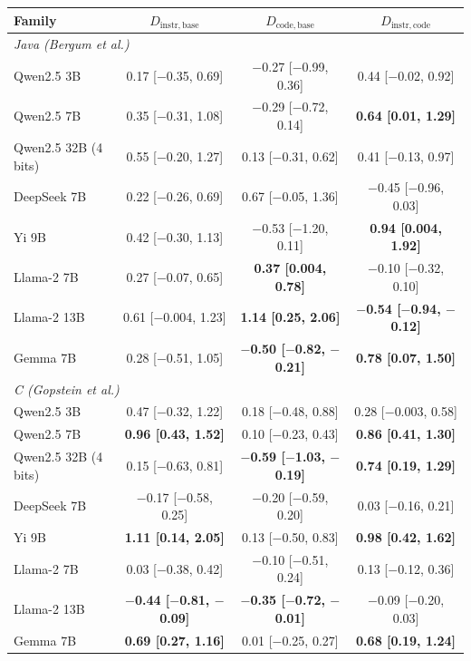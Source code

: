 {\scriptsize\setlength{\tabcolsep}{2.5pt}
\begin{tabular}{lccc}
\toprule
Family & $D_{\mathrm{instr},\mathrm{base}}$ & $D_{\mathrm{code},\mathrm{base}}$ & $D_{\mathrm{instr},\mathrm{code}}$ \\
\midrule
\multicolumn{4}{l}{\textit{Java (Bergum et al.)}} \\
\midrule
Qwen2.5 3B & 0.17 [$-$0.35, 0.69] & $-$0.27 [$-$0.99, 0.36] & 0.44 [$-$0.02, 0.92] \\
Qwen2.5 7B & 0.35 [$-$0.31, 1.08] & $-$0.29 [$-$0.72, 0.14] & \textbf{0.64 [0.01, 1.29]} \\
Qwen2.5 32B (4 bits) & 0.55 [$-$0.20, 1.27] & 0.13 [$-$0.31, 0.62] & 0.41 [$-$0.13, 0.97] \\
DeepSeek 7B & 0.22 [$-$0.26, 0.69] & 0.67 [$-$0.05, 1.36] & $-$0.45 [$-$0.96, 0.03] \\
Yi 9B & 0.42 [$-$0.30, 1.13] & $-$0.53 [$-$1.20, 0.11] & \textbf{0.94 [0.004, 1.92]} \\
Llama-2 7B & 0.27 [$-$0.07, 0.65] & \textbf{0.37 [0.004, 0.78]} & $-$0.10 [$-$0.32, 0.10] \\
Llama-2 13B & 0.61 [$-$0.004, 1.23] & \textbf{1.14 [0.25, 2.06]} & \textbf{$-$0.54 [$-$0.94, $-$0.12]} \\
Gemma 7B & 0.28 [$-$0.51, 1.05] & \textbf{$-$0.50 [$-$0.82, $-$0.21]} & \textbf{0.78 [0.07, 1.50]} \\
\midrule
\multicolumn{4}{l}{\textit{C (Gopstein et al.)}} \\
\midrule
Qwen2.5 3B & 0.47 [$-$0.32, 1.22] & 0.18 [$-$0.48, 0.88] & 0.28 [$-$0.003, 0.58] \\
Qwen2.5 7B & \textbf{0.96 [0.43, 1.52]} & 0.10 [$-$0.23, 0.43] & \textbf{0.86 [0.41, 1.30]} \\
Qwen2.5 32B (4 bits) & 0.15 [$-$0.63, 0.81] & \textbf{$-$0.59 [$-$1.03, $-$0.19]} & \textbf{0.74 [0.19, 1.29]} \\
DeepSeek 7B & $-$0.17 [$-$0.58, 0.25] & $-$0.20 [$-$0.59, 0.20] & 0.03 [$-$0.16, 0.21] \\
Yi 9B & \textbf{1.11 [0.14, 2.05]} & 0.13 [$-$0.50, 0.83] & \textbf{0.98 [0.42, 1.62]} \\
Llama-2 7B & 0.03 [$-$0.38, 0.42] & $-$0.10 [$-$0.51, 0.24] & 0.13 [$-$0.12, 0.36] \\
Llama-2 13B & \textbf{$-$0.44 [$-$0.81, $-$0.09]} & \textbf{$-$0.35 [$-$0.72, $-$0.01]} & $-$0.09 [$-$0.20, 0.03] \\
Gemma 7B & \textbf{0.69 [0.27, 1.16]} & 0.01 [$-$0.25, 0.27] & \textbf{0.68 [0.19, 1.24]} \\
\bottomrule
\end{tabular}}
